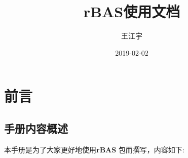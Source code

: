 \documentclass[]{ctexbook}
\title{rBAS使用文档}
\author{王江宇}
\date{2019-02-02}
\begin{document}
\maketitle

{
\setcounter{tocdepth}{2}
\tableofcontents
}
\listoftables
\listoffigures
\mainmatter

\chapter*{前言}


\section*{手册内容概述}


本手册是为了大家更好地使用\textbf{rBAS}
\citep{R-rBAS}包而撰写，内容如下:
\end{document}
